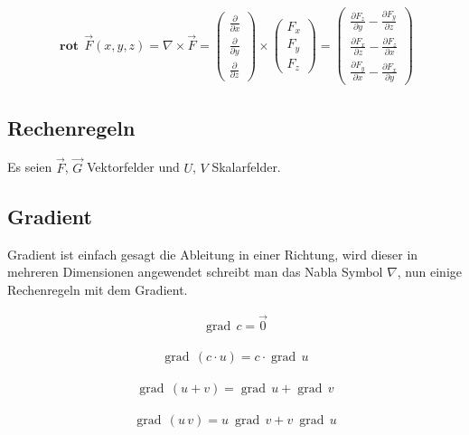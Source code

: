 \documentclass[a4paper]{scrartcl}
\begin{document}
\begin{align}
\mathbf{\operatorname{rot}}\,\vec F(x,y,z) = \nabla\times \vec F =
\begin{pmatrix} \frac{\partial}{\partial x} \\ \frac{\partial}{\partial y} \\
\frac{\partial}{\partial z} \end{pmatrix} \times \begin{pmatrix} F_x\\ F_y\\ F_z
\end{pmatrix} = \begin{pmatrix} \frac{\partial F_z}{\partial y} - \frac{\partial
F_y}{\partial z} \\ \frac{\partial F_x}{\partial z} - \frac{\partial
F_z}{\partial x} \\ \frac{\partial F_y}{\partial x} - \frac{\partial
F_x}{\partial y} \end{pmatrix}
\end{align}

\subsection{Rechenregeln}
Es seien $\vec F$, $\vec G$ Vektorfelder und $U$, $V$ Skalarfelder.


\subsection{Gradient}

Gradient ist einfach gesagt die Ableitung in einer Richtung, wird dieser in mehreren Dimensionen angewendet schreibt man das Nabla Symbol $ \nabla $, nun einige Rechenregeln mit dem Gradient.

\begin{align}
\operatorname{grad}\,c=\vec{0}
\end{align}

\begin{align}
\operatorname{grad}\,(c\cdot u)=c\cdot\operatorname{grad}\,u
\end{align}

\begin{align}
\operatorname{grad}\,(u+v)=\operatorname{grad}\,u+\operatorname{grad}\,v
\end{align}

\begin{align}
\operatorname{grad}\,(u\, v) = u\ \operatorname{grad}\,v + v\ \operatorname{grad}\,u
\end{align}
\end{document}
